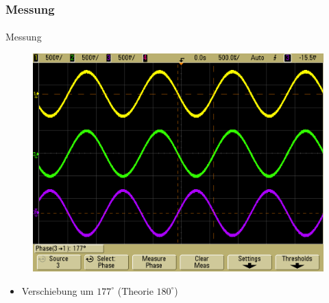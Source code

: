 \begin{frame}
\frametitle{Messung}
\framesubtitle{}
    \begin{block}{Messung}
        \begin{figure}[H]
        \begin{center}
                \includegraphics[scale=0.2]{./img/oszi/scope_15.png}
        \end{center}
        \end{figure}
        \begin{itemize}
            \item Verschiebung um $177^{\circ}$ (Theorie $180^{\circ}$)
        \end{itemize}
        
    \end{block}
\end{frame}
